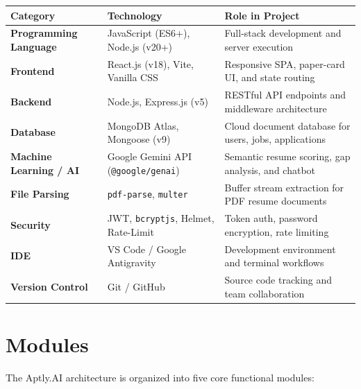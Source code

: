 \documentclass[12pt, a4paper]{article}
\begin{document}
\vspace{0.2cm}
\begin{center}
\renewcommand{\arraystretch}{1.18}
\begin{tabularx}{\textwidth}{l p{5.2cm} X}
\toprule
\textbf{\color{primary}Category} & \textbf{\color{primary}Technology} & \textbf{\color{primary}Role in Project} \\
\midrule
\textbf{Programming Language} & JavaScript (ES6+), Node.js (v20+) & Full-stack development and server execution \\
\textbf{Frontend} & React.js (v18), Vite, Vanilla CSS & Responsive SPA, paper-card UI, and state routing \\
\textbf{Backend} & Node.js, Express.js (v5) & RESTful API endpoints and middleware architecture \\
\textbf{Database} & MongoDB Atlas, Mongoose (v9) & Cloud document database for users, jobs, applications \\
\textbf{Machine Learning / AI} & Google Gemini API (\texttt{@google/genai}) & Semantic resume scoring, gap analysis, and chatbot \\
\textbf{File Parsing} & \texttt{pdf-parse}, \texttt{multer} & Buffer stream extraction for PDF resume documents \\
\textbf{Security} & JWT, \texttt{bcryptjs}, Helmet, Rate-Limit & Token auth, password encryption, rate limiting \\
\textbf{IDE} & VS Code / Google Antigravity & Development environment and terminal workflows \\
\textbf{Version Control} & Git / GitHub & Source code tracking and team collaboration \\
\bottomrule
\end{tabularx}
\end{center}

\vspace{0.3cm}

\section{Modules}
The Aptly.AI architecture is organized into five core functional modules:
\end{document}
